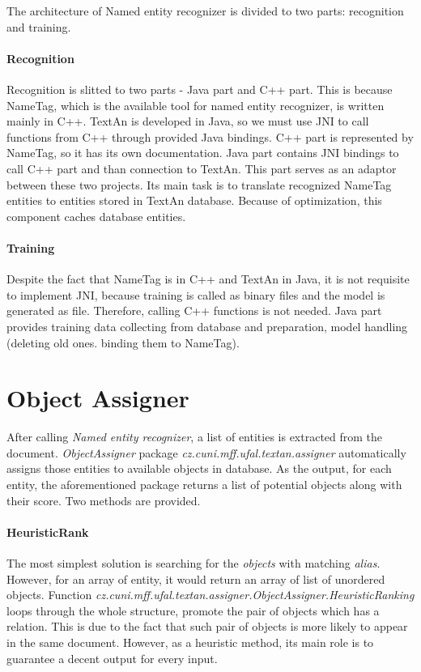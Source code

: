 The architecture of Named entity recognizer is divided to two parts: recognition and training.

\paragraph{Recognition} 
Recognition is slitted to two parts - Java part and C++ part. This is because
NameTag, which is the available tool for named entity recognizer, is written mainly in C++. 
TextAn is developed in Java, so we must use JNI to call functions from C++ through provided
Java bindings. C++ part is represented by NameTag, so it has its own documentation.
Java part contains JNI bindings to call C++ part and than connection to TextAn.
This part serves as an adaptor between these two projects. Its main task is
to translate recognized NameTag entities to entities stored in TextAn database.
Because of optimization, this component caches database entities.

\paragraph{Training}
Despite the fact that NameTag is in C++ and TextAn in Java, it is not requisite 
to implement JNI, because training is called as binary files and the model is generated
as file. Therefore, calling C++ functions is not needed. Java part provides
training data collecting from database and preparation, model handling
(deleting old ones. binding them to NameTag).

\section{Object Assigner}
\label{sec:ObjectAssigner}

After calling \emph{Named entity recognizer}, a list of entities is extracted from the document. \emph{ObjectAssigner}
package \emph{cz.cuni.mff.ufal.textan.assigner} automatically
assigns those entities to available objects in database. As the output, for 
each entity, the aforementioned package returns a list of potential objects along
with their score. Two methods are provided.

\paragraph{HeuristicRank}
The most simplest solution is searching for the \textit{objects} with matching 
\textit{alias}. However, for an array of entity, it would return an array of 
list of unordered objects.
Function \emph{cz.cuni.mff.ufal.textan.assigner.ObjectAssigner.HeuristicRanking}
loops through the whole structure, promote the pair of objects which has a relation. This is due to the fact that such pair of objects is more likely to appear in the same document. However, as a heuristic method, its main role is to guarantee a decent output for every input.

